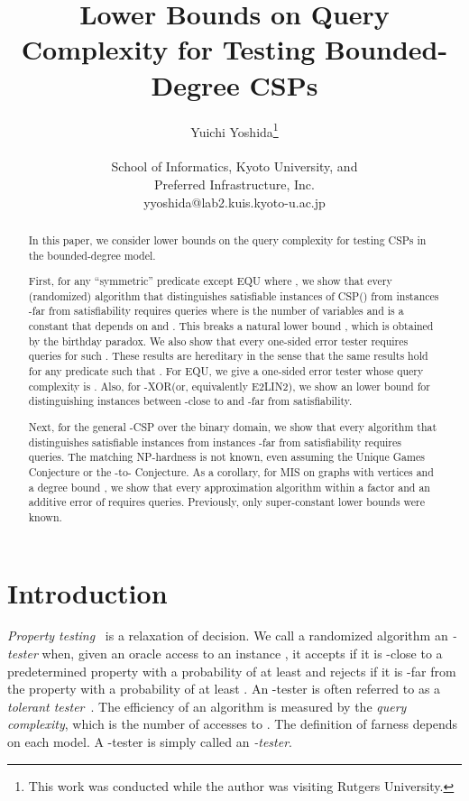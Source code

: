 \documentclass[letterpaper,11pt]{article}
\title{Lower Bounds on Query Complexity for Testing Bounded-Degree CSPs}
\author{Yuichi Yoshida\thanks{This work was conducted while the author was visiting Rutgers University.}\\\\
  School of Informatics, Kyoto University, and\\ Preferred Infrastructure, Inc.\\yyoshida@lab2.kuis.kyoto-u.ac.jp}
\date{}
\newcommand{\mis}{\textsf{MIS}\xspace}
\newcommand{\kcsp}{\textsf{-CSP}\xspace}
\newcommand{\csp}[1]{\textsf{CSP}(#1)\xspace}
\newcommand{\equ}{\textsf{EQU}\xspace}
\newcommand{\txor}{\textsf{-XOR}\xspace}
\begin{document}
\setcounter{page}{0}
\maketitle
\begin{abstract}
  In this paper, we consider lower bounds on the query complexity for testing CSPs in the bounded-degree model.

  First, for any ``symmetric'' predicate  except \equ where , 
  we show that every (randomized) algorithm that distinguishes satisfiable instances of \csp{} from instances -far from satisfiability requires  queries where  is the number of variables and  is a constant that depends on  and .
  This breaks a natural lower bound , which is obtained by the birthday paradox.
  We also show that every one-sided error tester requires  queries for such .
  These results are hereditary in the sense that the same results hold for any predicate  such that .
  For \equ, we give a one-sided error tester whose query complexity is .
  Also, for \txor (or, equivalently \textsf{E2LIN2}), 
  we show an  lower bound for distinguishing instances between -close to and -far from satisfiability.

  Next, for the general \kcsp over the binary domain,
  we show that every algorithm that distinguishes satisfiable instances from instances -far from satisfiability requires  queries.
  The matching NP-hardness is not known, even assuming the Unique Games Conjecture or the -to- Conjecture.
  As a corollary, for \mis on graphs with  vertices and a degree bound ,
  we show that every approximation algorithm within a factor  and an additive error of  requires  queries.
  Previously, only super-constant lower bounds were known.
\end{abstract}
\newpage
\section{Introduction}
\textit{Property testing}~\cite{GGR98} is a relaxation of decision.
We call a randomized algorithm an \textit{-tester} when, 
given an oracle access  to an instance , 
it accepts  if it is -close to a predetermined property with a probability of at least  and rejects  if it is -far from the property with a probability of at least .
An -tester is often referred to as a \textit{tolerant tester}~\cite{PRR06}.
The efficiency of an algorithm is measured by the \textit{query complexity}, which is the number of accesses to .
The definition of farness depends on each model.
A -tester is simply called an \textit{-tester}.
\end{document}
